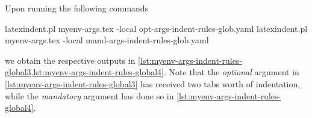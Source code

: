  Upon running the following commands 
 \begin{commandshell}
latexindent.pl myenv-args.tex -local opt-args-indent-rules-glob.yaml
latexindent.pl myenv-args.tex -local mand-args-indent-rules-glob.yaml
\end{commandshell}
 we obtain the respective outputs in
 \cref{lst:myenv-args-indent-rules-global3,lst:myenv-args-indent-rules-global4}. Note that
 the \emph{optional} argument in \cref{lst:myenv-args-indent-rules-global3} has received
 two tabs worth of indentation, while the \emph{mandatory} argument has done so in
 \cref{lst:myenv-args-indent-rules-global4}.

 \begin{widepage}
  \begin{minipage}{.55\textwidth}
  \end{minipage}
  \hfill
  \begin{minipage}{.55\textwidth}
  \end{minipage}
 \end{widepage}
